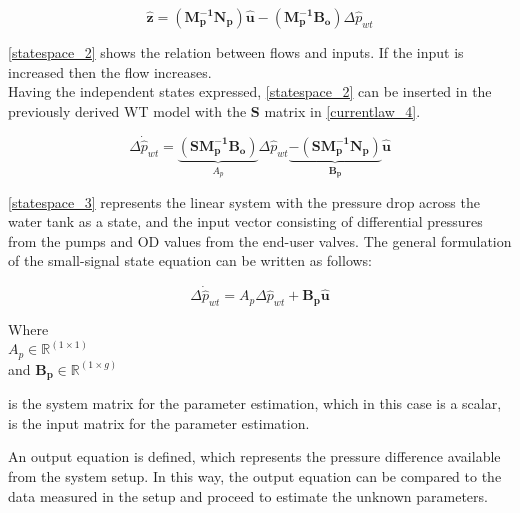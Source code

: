 \begin{equation}
 \bm{\hat{z}} = (\bm{M_p^{-1}}\bm{N_p})\bm{\hat{u}} - (\bm{M_p^{-1}}\bm{B_o})\Delta \hat{p}_{wt}    
 \label{statespace_2}
\end{equation}

\eqref{statespace_2} shows the relation between flows and inputs. If the input is increased then the flow increases. 
\\
Having the independent states expressed, \eqref{statespace_2} can be inserted in the previously derived WT model with the $\bm{S}$ matrix in \eqref{currentlaw_4}. 

\begin{equation}
\Delta \dot{\hat{p}}_{wt} =  \underbrace{(\bm{S}\bm{M_p^{-1}}\bm{B_o})}_\text{$A_p$} \Delta \hat{p}_{wt}   \underbrace{-(\bm{S}\bm{M_p^{-1}}\bm{N_p})}_\text{$\bm{B_p}$} \bm{\hat{u}} 
\label{statespace_3}
\end{equation}

\eqref{statespace_3} represents the linear system with the pressure drop across the water tank as a state, and the input vector consisting of differential pressures from the pumps and OD values from the end-user valves. The general formulation of the small-signal state equation can be written as follows:  

\begin{equation}
\Delta \dot{\hat{p}}_{wt} =  A_p \Delta \hat{p}_{wt}  + \bm{B_p}\bm{\hat{u}}  
 \label{statespace_4}
\end{equation}

\begin{minipage}[t]{0.24\textwidth}
Where\\
\hspace*{8mm} $A_p \in \mathbb{R}^{(1 \times 1)} $ \\
\newline
and \hspace*{0.7mm} $\bm{B_p} \in \bm{\mathbb{R}}^{(1 \times g)} $ 
\end{minipage}
\begin{minipage}[t]{0.74\textwidth}
\vspace*{2mm}
is the system matrix for the parameter estimation, which in this case is a scalar, \\
is the input matrix for the parameter estimation.
\end{minipage} 

An output equation is defined, which represents the pressure difference available from the system setup. In this way, the output equation can be compared 
to the data measured in the setup and proceed to estimate the unknown parameters. 

